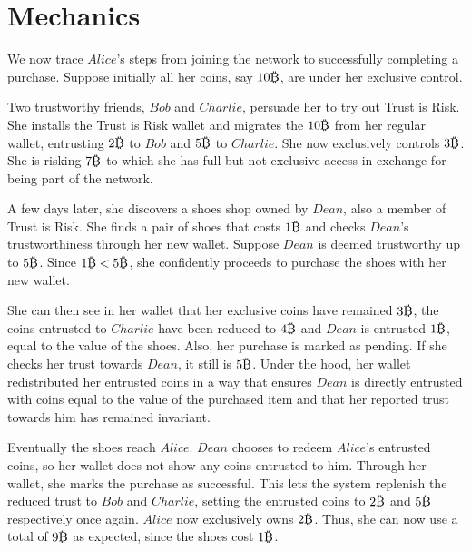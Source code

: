 \section{Mechanics}
  We now trace $Alice$'s steps from joining the network to successfully completing a purchase. Suppose initially all her
  coins, say $10\bitcoin$, are under her exclusive control.

  Two trustworthy friends, $Bob$ and $Charlie$, persuade her to try out Trust is Risk. She installs the Trust is Risk wallet
  and migrates the $10\bitcoin$ from her regular wallet, entrusting $2\bitcoin$ to $Bob$ and $5\bitcoin$ to $Charlie$. She now
  exclusively controls $3\bitcoin$. She is risking $7\bitcoin$ to which she has full but not exclusive access in exchange for
  being part of the network.

  A few days later, she discovers a shoes shop owned by $Dean$, also a member of Trust is Risk. She finds a pair of shoes that
  costs $1\bitcoin$ and checks $Dean$'s trustworthiness through her new wallet. Suppose $Dean$ is deemed trustworthy up to
  $5\bitcoin$. Since $1\bitcoin < 5\bitcoin$, she confidently proceeds to purchase the shoes with her new wallet.

  She can then see in her wallet that her exclusive coins have remained $3\bitcoin$, the coins entrusted to $Charlie$ have
  been reduced to $4\bitcoin$ and $Dean$ is entrusted $1\bitcoin$, equal to the value of the shoes. Also, her purchase is
  marked as pending. If she checks her trust towards $Dean$, it still is $5\bitcoin$. Under the hood, her wallet redistributed
  her entrusted coins in a way that ensures $Dean$ is directly entrusted with coins equal to the value of the purchased item
  and that her reported trust towards him has remained invariant.

  Eventually the shoes reach $Alice$. $Dean$ chooses to redeem $Alice$'s entrusted coins, so her wallet does not show any
  coins entrusted to him. Through her wallet, she marks the purchase as successful. This lets the system replenish the reduced
  trust to $Bob$ and $Charlie$, setting the entrusted coins to $2\bitcoin$ and $5\bitcoin$ respectively once again.  $Alice$
  now exclusively owns $2\bitcoin$. Thus, she can now use a total of $9\bitcoin$ as expected, since the shoes cost
  $1\bitcoin$.
